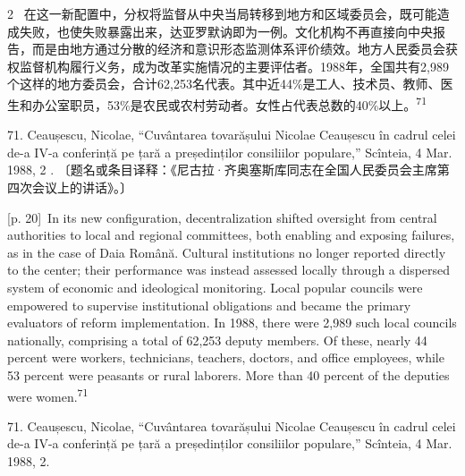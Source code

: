 \documentclass[10pt,a4paper]{article}
\begin{document}
\begin{paracol}{2}
\switchcolumn*
{\scriptsize\color{gray} [p. 20]}\ 在这一新配置中，分权将监督从中央当局转移到地方和区域委员会，既可能造成失败，也使失败暴露出来，达亚罗默讷即为一例。文化机构不再直接向中央报告，而是由地方通过分散的经济和意识形态监测体系评价绩效。地方人民委员会获权监督机构履行义务，成为改革实施情况的主要评估者。1988年，全国共有2,989个这样的地方委员会，合计62,253名代表。其中近44\%是工人、技术员、教师、医生和办公室职员，53\%是农民或农村劳动者。女性占代表总数的40\%以\mbox{上。\textsuperscript{71}}\par{\small 71. Ceaușescu, Nicolae, “Cuvântarea tovarășului Nicolae Ceaușescu în cadrul celei de-a IV-a conferință pe țară a președinților consiliilor populare,” Scînteia, 4 Mar. 1988, 2 . 〔题名或条目译释：《尼古拉·齐奥塞斯库同志在全国人民委员会主席第四次会议上的讲话》。〕\par}
\switchcolumn
{\scriptsize\color{gray} [p. 20]}\ In its new configuration, decentralization shifted oversight from central authorities to local and regional committees, both enabling and exposing failures, as in the case of Daia Română. Cultural institutions no longer reported directly to the center; their performance was instead assessed locally through a dispersed system of economic and ideological monitoring. Local popular councils were empowered to supervise institutional obligations and became the primary evaluators of reform implementation. In 1988, there were 2,989 such local councils nationally, comprising a total of 62,253 deputy members. Of these, nearly 44 percent were workers, technicians, teachers, doctors, and office employees, while 53 percent were peasants or rural laborers. More than 40 percent of the deputies were women.\nobreak\textsuperscript{71}\par{\small 71. Ceaușescu, Nicolae, “Cuvântarea tovarășului Nicolae Ceaușescu în cadrul celei de-a IV-a conferință pe țară a președinților consiliilor populare,” Scînteia, 4 Mar. 1988, 2.\par}
\switchcolumn*

\end{paracol}
\end{document}
